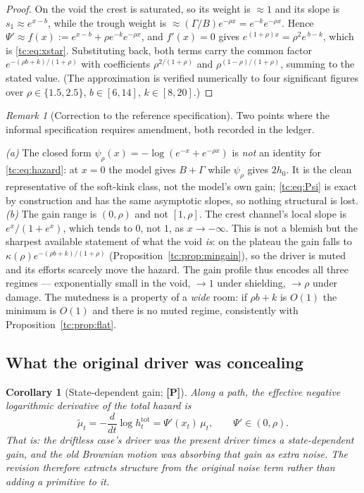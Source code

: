 \documentclass[11pt]{article}
\numberwithin{equation}{section}
\theoremstyle{plain}
\newtheorem{corollary}[theorem]{Corollary}
\theoremstyle{definition}
\theoremstyle{remark}
\newtheorem{remark}[theorem]{Remark}
\begin{document}
\begin{proof}
On the void the crest is saturated, so its weight is $\approx1$ and its
slope is $s_{1}\approx e^{x-b}$, while the trough weight is
$\approx(\Gamma/B)e^{-\rho x}=e^{-k}e^{-\rho x}$. Hence
$\Psi'\approx f(x):=e^{x-b}+\rho e^{-k}e^{-\rho x}$, and $f'(x)=0$ gives
$e^{(1+\rho)x}=\rho^{2}e^{\,b-k}$, which is \eqref{tc:eq:xstar}.
Substituting back, both terms carry the common factor
$e^{-(\rho b+k)/(1+\rho)}$ with coefficients $\rho^{2/(1+\rho)}$ and
$\rho^{(1-\rho)/(1+\rho)}$, summing to the stated value. (The
approximation is verified numerically to four significant figures over
$\rho\in\{1.5,2.5\}$, $b\in[6,14]$, $k\in[8,20]$.)
\end{proof}

\begin{remark}[Correction to the reference specification]
\label{tc:rem:speccorr}
Two points where the informal specification requires amendment, both
recorded in the ledger.

\emph{(a)} The closed form $\psi_\rho(x)=-\log(e^{-x}+e^{-\rho x})$ is
\emph{not} an identity for \eqref{tc:eq:hazard}: at $x=0$ the model
gives $B+\Gamma$ while $\psi_\rho$ gives $2h_0$. It is the clean
representative of the soft-kink class, not the model's own gain;
\eqref{tc:eq:Psi} is exact by construction and has the same asymptotic
slopes, so nothing structural is lost. \emph{(b)} The gain range is $(0,\rho)$ and not $[1,\rho]$. The crest
channel's local slope is $e^{x}/(1+e^{x})$, which tends to $0$, not $1$,
as $x\to-\infty$. This is not a blemish but the sharpest available
statement of what the void \emph{is}: on the plateau the gain falls to
$\kappa(\rho)e^{-(\rho b+k)/(1+\rho)}$
(Proposition~\ref{tc:prop:mingain}), so
the driver is muted and its efforts scarcely move the hazard. The gain
profile thus encodes all three regimes --- exponentially small in the
void, $\to1$ under shielding, $\to\rho$ under damage. The mutedness is a
property of a \emph{wide} room: if $\rho b+k$ is $O(1)$ the minimum is
$O(1)$ and there is no muted regime, consistently with
Proposition~\ref{tc:prop:flat}.
\end{remark}

\subsection{What the original driver was concealing}
\label{tc:subsub:concealed}

\begin{corollary}[State-dependent gain; \textbf{[P]}]
\label{tc:cor:concealed}
Along a path, the effective negative logarithmic derivative of the total
hazard is
\begin{equation}\label{tc:eq:effmu}
\tilde\mu_t=-\frac{d}{dt}\log h^{\mathrm{tot}}_t
=\Psi'(x_t)\,\mu_t,
\qquad \Psi'\in(0,\rho).
\end{equation}
That is: \emph{the driftless case's driver was the present driver times a
state-dependent gain}, and the old Brownian motion was absorbing that
gain as extra noise. The revision therefore extracts structure from the
original noise term rather than adding a primitive to it.
\end{corollary}
\end{document}
